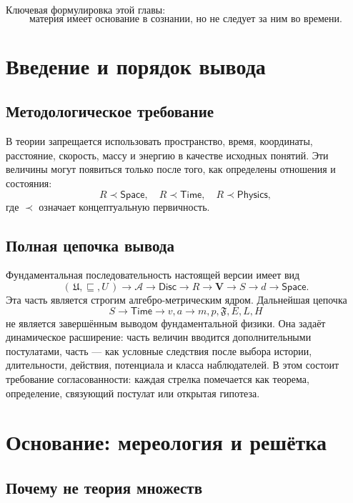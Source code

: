 \documentclass[12pt,a4paper,oneside]{book}
\theoremstyle{definition}
\theoremstyle{plain}
\theoremstyle{remark}
\newcommand{\Whole}{U}
\newcommand{\Parts}{\mathcal A}
\newcommand{\Rel}{R}
\newcommand{\Vstruct}{\mathbf V}
\newcommand{\State}{S}
\newcommand{\PartOf}{\sqsubseteq}
\newcommand{\Disc}{\mathsf{Disc}}
\newcommand{\Space}{\mathsf{Space}}
\newcommand{\Time}{\mathsf{Time}}
\newcommand{\Physics}{\mathsf{Physics}}
\begin{document}
Ключевая формулировка этой главы:
\[
\boxed{\text{материя имеет основание в сознании, но не следует за ним во времени.}}
\]

\chapter{Введение и порядок вывода}

\section{Методологическое требование}

В теории запрещается использовать пространство, время, координаты, расстояние,
скорость, массу и энергию в качестве исходных понятий. Эти величины могут появиться
только после того, как определены отношения и состояния:
\[
\Rel\prec\Space,\quad \Rel\prec\Time,\quad \Rel\prec\Physics,
\]
где $\prec$ означает концептуальную первичность.

\section{Полная цепочка вывода}

Фундаментальная последовательность настоящей версии имеет вид
\[
(\,\mathfrak U,\PartOf,\Whole\,)
\to \Parts
\to \Disc
\to \Rel
\to \Vstruct
\to \State
\to d
\to \Space.
\]
Эта часть является строгим алгебро-метрическим ядром. Дальнейшая цепочка
\[
\State\to \Time\to v,a\to m,p,\mathfrak F,E,L,H
\]
не является завершённым выводом фундаментальной физики. Она задаёт динамическое
расширение: часть величин вводится дополнительными постулатами, часть --- как
условные следствия после выбора истории, длительности, действия, потенциала и
класса наблюдателей. В этом состоит требование согласованности: каждая стрелка
помечается как теорема, определение, связующий постулат или открытая гипотеза.

\chapter{Основание: мереология и решётка}

\section{Почему не теория множеств}
\end{document}
